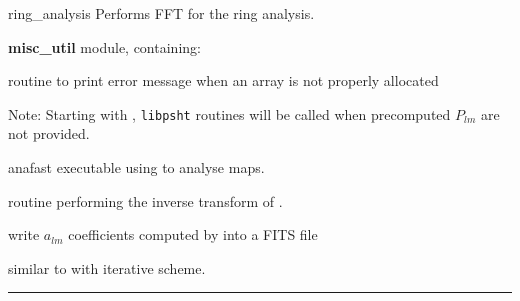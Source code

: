 \begin{modules}
  \begin{sulist}{} %
  \item[ring\_analysis] Performs FFT for the ring analysis.
  \item[\textbf{misc\_util}] module, containing:
  \item[\htmlref{assert\_alloc}{sub:assert}] routine to print error message when an array is not
  properly allocated		
  \end{sulist}
Note: Starting with , {\tt libpsht} routines will be called when
precomputed $P_{lm}$ are not provided.
\end{modules}

\begin{related}
  \begin{sulist}{} %
  \item[anafast] executable using \thedocid{} to analyse maps.
  \item[\htmlref{alm2map}{sub:alm2map}] routine performing the inverse transform
of \thedocid.
  \item[\htmlref{dump\_alms}{sub:dump_alms}] write $a_{lm}$ coefficients
computed by \thedocid{} into a FITS file
  \item[\htmlref{map2alm\_iterative}{sub:map2alm_iterative}] similar to
\thedocid{} with iterative scheme.
  \end{sulist}
\end{related}

\rule{\hsize}{2mm}

\newpage
